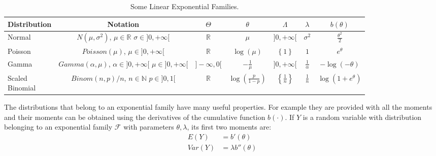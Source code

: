 \documentclass[a4paper, nobind]{templates/ociamthesis}
\theoremstyle{definition}
\theoremstyle{definition}
\theoremstyle{definition}
\theoremstyle{remark}
\begin{document}
\begin{table}[!h]

\caption{\label{tab:exp-families}Some Linear Exponential Families.}
\centering
\begin{tabular}[t]{lcccccc}
\toprule
\textbf{Distribution} & \textbf{Notation} & \textbf{$\Theta$} & \textbf{$\theta$} & \textbf{$\Lambda$} & \textbf{$\lambda$} & \textbf{$b(\theta)$}\\
\toprule\addlinespace
Normal & \makecell[c]{$N(\mu, \sigma^2)$,\\$\mu\in\mathbb{R}$ \\ $\sigma \in ]0, +\infty[$} & $\mathbb{R}$ & $\mu$ & $]0, +\infty[$ & $\sigma^2$ & $\frac{\theta^2}{2}$\\
\addlinespace\hline\addlinespace
Poisson & \makecell[c]{$Poisson(\mu)$,\\$\mu \in ]0, +\infty[$} & $\mathbb{R}$ & $\log{(\mu)}$ & $\left\{1\right\}$ & $1$ & $e^{\theta}$\\
\addlinespace\hline\addlinespace
Gamma & \makecell[c]{$Gamma(\alpha, \mu)$,\\$\alpha \in ]0, +\infty[$ \\ $\mu \in ]0, +\infty[$} & $]-\infty, 0[$ & $-\frac{1}{\mu}$ & $]0,+\infty[$ & $\frac{1}{\alpha}$ & $-\log{\left(-\theta\right)}$\\
\addlinespace\hline\addlinespace
\makecell[l]{Scaled\\Binomial} & \makecell[c]{$Binom(n, p)/n$,\\$n\in\mathbb{N}$ \\ $p\in]0,1[$} & $\mathbb{R}$ & $\log{\left(\frac{p}{1-p}\right)}$ & $\left\{\frac{1}{n}\right\}$ & $\frac{1}{n}$ & $\log\left(1+e^{\theta}\right)$\\
\bottomrule
\end{tabular}
\end{table}

The distributions that belong to an exponential family have many useful properties. For example they are provided with all the moments and their moments can be obtained using the derivatives of the cumulative function \(b(\cdot)\). If \(Y\) is a random variable with distribution belonging to an exponential family \(\mathcal{F}\) with parameters \(\theta, \lambda\), its first two moments are:
\begin{align}
\label{eq:exp-fam-expected-value}
E(Y)   & = b'(\theta) \\
Var(Y) & = \lambda b''(\theta)
\end{align}
\end{document}
